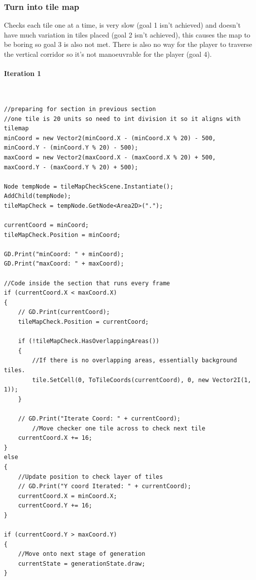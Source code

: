 \documentclass{article}
\newcommand{\myparagraph}[1]{\paragraph{#1}\mbox{}\\} %
\begin{document}
\subsubsection{Turn into tile map}
Checks each tile one at a time, is very slow (goal 1 isn't achieved) and doesn't have much variation in tiles placed (goal 2 isn't achieved), this causes the map to be boring so goal 3 is also not met. There is also no way for the player to traverse the vertical corridor so it's not manoeuvrable for the player (goal 4).
\myparagraph{Iteration 1}
\begin{lstlisting}
//preparing for section in previous section
//one tile is 20 units so need to int division it so it aligns with tilemap
minCoord = new Vector2(minCoord.X - (minCoord.X % 20) - 500, minCoord.Y - (minCoord.Y % 20) - 500);
maxCoord = new Vector2(maxCoord.X - (maxCoord.X % 20) + 500, maxCoord.Y - (maxCoord.Y % 20) + 500);

Node tempNode = tileMapCheckScene.Instantiate();
AddChild(tempNode);
tileMapCheck = tempNode.GetNode<Area2D>(".");

currentCoord = minCoord;
tileMapCheck.Position = minCoord;

GD.Print("minCoord: " + minCoord);
GD.Print("maxCoord: " + maxCoord);

//Code inside the section that runs every frame
if (currentCoord.X < maxCoord.X)
{
    // GD.Print(currentCoord);
    tileMapCheck.Position = currentCoord;

    if (!tileMapCheck.HasOverlappingAreas())
    {
    	//If there is no overlapping areas, essentially background tiles.
        tile.SetCell(0, ToTileCoords(currentCoord), 0, new Vector2I(1, 1));
    }

    // GD.Print("Iterate Coord: " + currentCoord);
    	//Move checker one tile across to check next tile
    currentCoord.X += 16;
}
else
{
	//Update position to check layer of tiles
    // GD.Print("Y coord Iterated: " + currentCoord);
    currentCoord.X = minCoord.X;
    currentCoord.Y += 16;
}

if (currentCoord.Y > maxCoord.Y)
{
	//Move onto next stage of generation
    currentState = generationState.draw;
}
\end{lstlisting}
\end{document}

